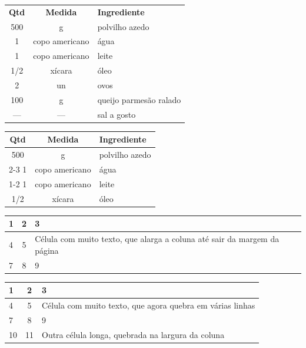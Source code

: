 \documentclass[a4paper]{article}
\begin{document}
\begin{tabular}{ccl}
  \textbf{Qtd} & \textbf{Medida}  & \textbf{Ingrediente} \\
  500          & g                & polvilho azedo \\
  1            & copo americano   & água \\
  1            & copo americano   & leite \\
  1/2          & xícara           & óleo \\
  2            & un               & ovos \\
  100          & g                & queijo parmesão ralado \\
  ---          & ---              & sal a gosto \\
\end{tabular}

\clearpage

\begin{tabular}{|c|c|l|}
  \hline
  \textbf{Qtd} & \textbf{Medida} & \textbf{Ingrediente} \\
  \hline
  500 & g              & polvilho azedo \\
  \cline{2-3}
  1   & copo americano & água \\
  \cline{1-2}
  1   & copo americano & leite \\ \hline
  1/2 & xícara         & óleo \\ \hline
\end{tabular}

\clearpage

\begin{tabular}{|l|c|l|}
  \hline
  1 & 2 & 3 \\ \hline
  4 & 5 & Célula com muito texto, que alarga a coluna até sair da margem
    da página \\ \hline
  7 & 8 & 9 \\ \hline
\end{tabular}

\clearpage

\begin{tabular}{|l|c|p{4cm}|}
  \hline
  1 & 2 & 3 \\ \hline
  4 & 5 & Célula com muito texto, que agora quebra em várias linhas \\ \hline
  7 & 8 & 9 \\ \hline
  10 & 11 & Outra célula longa, quebrada na largura da coluna \\ \hline
\end{tabular}
\end{document}
